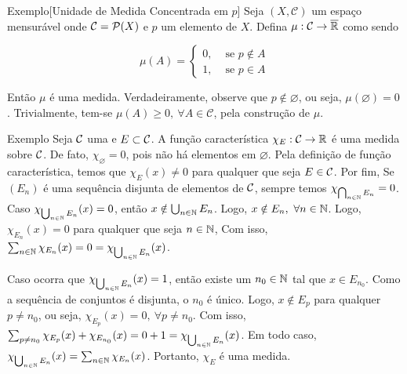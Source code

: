 \begin{env}{Exemplo}[Unidade de Medida Concentrada em $p$]
\label{ex:medida-concentrada-em-p}
    Seja $(X, \mathcal{C})$ um espaço mensurável onde $\operatorname{\mathcal{C}} = \mathcal{P}(X)$ e $p$ um elemento de $X$.
    Defina $\mu: \mathcal{C} \to \operatorname{\overline{\mathbb{R}}}$  como sendo

$$\mu(A) = \left\{\begin{array}{cc}
0, & \textrm{\ se \ } p \notin A \\
1, & \textrm{\ se \ } p \in A 
\end{array}\right.$$


Então $\mu$ é uma medida.
Verdadeiramente, observe que $p \notin \varnothing$, ou seja, $\mu(\varnothing) = 0$.
Trivialmente, tem-se $\mu(A) \geq 0,\ \forall A \in \mathcal{C}$, pela construção de $\mu$.


\end{env}

\begin{env}{Exemplo}
	\label{ex: função característica é uma medida}
	Seja $\operatorname{\mathcal{C}}$ uma \sigal e $E \subset \operatorname{\mathcal{C}}$.
	A função característica $\chi_{E}: \operatorname{\mathcal{C}} \to \mathbb{R}$ é uma medida sobre $\operatorname{\mathcal{C}}$.
	De fato, $\chi_{\varnothing} = 0$, pois não há elementos em $\varnothing$.
	Pela definição de função característica, temos que $\chi_E(x) \neq 0$ para qualquer que seja $E \in \operatorname{\mathcal{C}}$.
	Por fim, Se $(E_n)$ é uma sequência disjunta de elementos de $\operatorname{\mathcal{C}}$, sempre temos $\chi_{\bigcap_{n \in \operatorname{\mathbb{N}}}E_n} = 0$.
	Caso $\chi_{\bigcup_{n \in \operatorname{\mathbb{N}}}E_n}(x) = 0$, então $x \notin \bigcup_{n \in \operatorname{\mathbb{N}}}E_n$. 
	Logo, $x \notin E_n,\ \forall n \in \operatorname{\mathbb{N}}$.
	Logo, $\chi_{E_n}(x) = 0$ para qualquer que seja $n \in \operatorname{\mathbb{N}}$, 
	Com isso, $\sum_{n \in \operatorname{\mathbb{N}}} \chi_{E_n}(x) = 0 = \chi_{\bigcup_{n \in \operatorname{\mathbb{N}}}E_n}(x)$.
	
	Caso ocorra que  $\chi_{\bigcup_{n \in \operatorname{\mathbb{N}}}E_n}(x) = 1$, então existe um $n_0 \in \operatorname{\mathbb{N}}$ tal que $ x \in E_{n_0}$.
	Como a sequência de conjuntos é disjunta, o $n_0$ é único.
	Logo, $x \notin E_p$ para qualquer $p \neq n_0$, ou seja, $\chi_{E_p}(x) = 0, \ \forall p \neq n_0$.
	Com isso, $\sum_{p \neq n_0} \chi_{E_p}(x) + \chi_{E_{n_0}}(x) = 0 + 1 =  \chi_{\bigcup_{n \in \operatorname{\mathbb{N}}}E_n}(x)$.
	Em todo caso, $\chi_{\bigcup_{n \in \operatorname{\mathbb{N}}}E_n}(x) = \sum_{n \in \operatorname{\mathbb{N}}} \chi_{E_n}(x)$. 
	Portanto, $\chi_E$ é uma medida.
\end{env}


\begin{comment}
	\begin{env}{Exemplo}
		Seja $X = \N$ e $\mathcal{C}$ sendo o conjunto das partes de $\N$. 
		para $A \in \mathcal{C}$, definimos $\mu(A)$ por meio da sua cardinalidade, isto é, se $A$ é finito, então $\mu(A)$ é quantidade de elementos de $A$. Caso contrário, $\mu(A) = +\infty$.	
	\end{env}
\end{comment}



